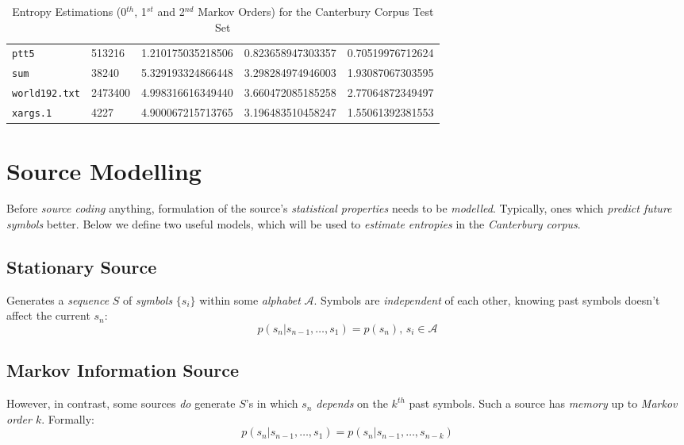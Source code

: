 \documentclass[a4paper, twocolumn]{article}
\begin{document}
\begin{table*}[t]
\begin{tabular}{lllll}
            \texttt{ptt5} & 513216 & 1.210175035218506 & 0.823658947303357 & 0.70519976712624 \\
            \texttt{sum} & 38240 & 5.329193324866448 & 3.298284974946003 & 1.93087067303595 \\
            \texttt{world192.txt} & 2473400 & 4.998316616349440 & 3.660472085185258 & 2.77064872349497 \\
            \texttt{xargs.1} & 4227 & 4.900067215713765 & 3.196483510458247 & 1.55061392381553 \\
        \bottomrule
        \end{tabular}
        \caption{Entropy Estimations (0$^{th}$, 1$^{st}$ and 2$^{nd}$ Markov Orders) for the Canterbury Corpus Test Set}
        \label{tab:canterbury}
    \end{table*}

    \section{Source Modelling} \label{sec:source_modelling}

        Before \emph{source coding} anything, formulation of the source's \emph{statistical properties} needs to be \emph{modelled}. Typically, ones which \emph{predict future symbols} better. Below we define two useful models, which will be used to \emph{estimate entropies} in the \emph{Canterbury corpus}.

        \subsection{Stationary Source} \label{sec:stationary_source}

        Generates a \emph{sequence} \(S\) of \emph{symbols} \(\{s_i\}\) within some \emph{alphabet} \(\mathcal{A}\). Symbols are \emph{independent} of each other, knowing past symbols doesn't affect the current \(s_n\): \[p(s_n | s_{n-1}, \dots, s_{1}) = p(s_n),\, s_i \in \mathcal{A}\]

        \subsection{Markov Information Source} \label{sec:markov_information_source}

        However, in contrast, some sources \emph{do} generate \(S\)'s in which \(s_n\) \emph{depends} on the \(k^{th}\) past symbols. Such a source has \emph{memory} up to \emph{Markov order \(k\)}. Formally: \[p(s_n | s_{n-1}, \dots, s_{1}) = p(s_n | s_{n-1}, \dots, s_{n-k})\]
\end{document}
